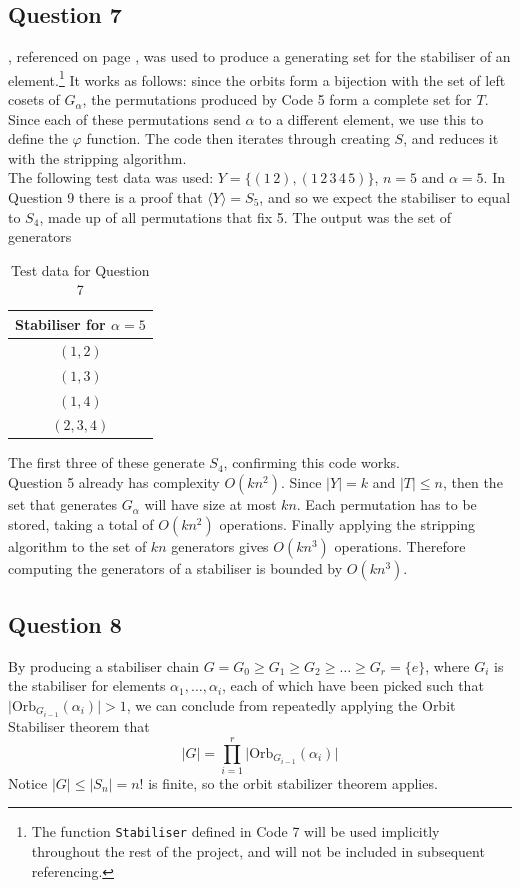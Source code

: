 \documentclass[10pt,a4paper,notitlepage]{article}
\newcommand{\abs}[1]{\lvert#1\rvert}
\newcommand{\Orb}{\text{Orb}}
\begin{document}
\subsection*{\centering Question 7}
, referenced on page \pageref{cd:7}, was used to produce a generating set for the stabiliser of an element.\footnote{The function \texttt{Stabiliser} defined in Code 7 will be used implicitly throughout the rest of the project, and will not be included in subsequent referencing.} It works as follows: since the orbits form a bijection with the set of left cosets of $G_{\alpha}$, the permutations produced by Code 5 form a complete set for $T$.  Since each of these permutations send $\alpha$ to a different element, we use this to define the $\varphi$ function. The code then iterates through creating $S$, and reduces it with the stripping algorithm. \\

The following test data was used: $Y=\lbrace (1 \, 2), (1 \, 2 \, 3 \, 4 \, 5)\rbrace$, $n=5$ and $\alpha=5$. In Question 9 there is a proof that $\langle Y \rangle=S_{5}$, and so we expect the stabiliser to equal to $S_{4}$, made up of all permutations that fix 5. The output was the set of generators 
\begin{table}[H]
\centering
\begin{tabular}{|c|}
\hline Stabiliser for $\alpha=5$ \\
\hline $(1,2)$\\
$(1,3)$\\
$(1,4)$\\
$(2,3,4)$\\
\hline
\end{tabular}
\caption{Test data for Question 7}
\end{table}
The first three of these generate $S_{4}$, confirming this code works. \\
Question 5 already has complexity $O(kn^{2})$.  Since $\abs{Y}=k$ and $\abs{T}\leq n$, then the set that generates $G_{\alpha}$ will have size at most $kn$. Each permutation has to be stored, taking a total of $O(kn^{2})$ operations. Finally applying the stripping algorithm to the set of $kn$ generators gives $O(kn^{3})$ operations. Therefore computing the generators of a stabiliser is bounded by $O(kn^{3})$.

\subsection*{\centering Question 8}
By producing a stabiliser chain $G=G_{0}\geq G_{1}\geq G_{2}\geq \hdots \geq G_{r}=\lbrace e\rbrace$, where $G_{i}$ is the stabiliser for elements $\alpha_{1},\hdots,\alpha_{i}$, each of which have been picked such that $\abs{\Orb_{G_{i-1}}(\alpha_{i})}> 1$, we can conclude from repeatedly applying the Orbit Stabiliser theorem that
\begin{equation}
\abs{G}=\prod_{i=1}^{r}\abs{\Orb_{G_{i-1}}(\alpha_{i})}
\end{equation}
Notice $\abs{G}\leq \abs{S_{n}}=n!$ is finite, so the orbit stabilizer theorem applies. \\
\end{document}
